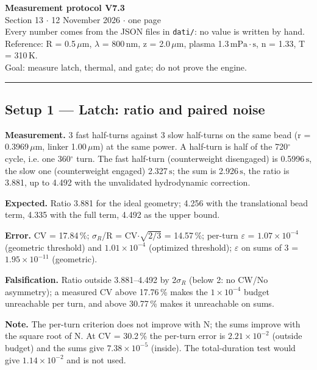 \documentclass[9pt,a4paper]{article}
\begin{document}
\raggedright
\fontsize{9.5}{11.4}\selectfont
\begin{center}
{\Large\bfseries Measurement protocol V7.3}\\[2pt]
{\small Section 13 $\cdot$ 12 November 2026 $\cdot$ one page}\\
{\small Every number comes from the JSON files in \texttt{dati/}: no value is written by hand.}\\
{\small Reference: R = 0.5\,$\mu\mathrm{m}$, $\lambda$ = 800\,$\mathrm{nm}$, z = 2.0\,$\mu\mathrm{m}$, plasma 1.3\,$\mathrm{mPa}\cdot\mathrm{s}$, n = 1.33, T = 310\,$\mathrm{K}$.}\\
{\small Goal: measure latch, thermal, and gate; do not prove the engine.}
\end{center}
\hrule\vspace{2pt}
\subsection*{Setup 1 --- Latch: ratio and paired noise}
\textbf{Measurement.} 3 fast half-turns against 3 slow half-turns on the same bead (r = 0.3969\,$\mu\mathrm{m}$, linker 1.00\,$\mu\mathrm{m}$) at the same power. A half-turn is half of the 720$^{\circ}$ cycle, i.e. one 360$^{\circ}$ turn. The fast half-turn (counterweight disengaged) is 0.5996\,$\mathrm{s}$, the slow one (counterweight engaged) 2.327\,$\mathrm{s}$; the sum is 2.926\,$\mathrm{s}$, the ratio is 3.881, up to 4.492 with the unvalidated hydrodynamic correction.

\textbf{Expected.} Ratio 3.881 for the ideal geometry; 4.256 with the translational bead term, 4.335 with the full term, 4.492 as the upper bound.

\textbf{Error.} CV = 17.84\,\%; $\sigma_R$/R = CV$\cdot$$\sqrt{2/3}$ = 14.57\,\%; per-turn $\varepsilon$ = $1.07\times 10^{-4}$ (geometric threshold) and $1.01\times 10^{-4}$ (optimized threshold); $\varepsilon$ on sums of 3 = $1.95\times 10^{-11}$ (geometric).

\textbf{Falsification.} Ratio outside 3.881--4.492 by 2$\sigma_R$ (below 2: no CW/No asymmetry); a measured CV above 17.76\,\% makes the $1\times 10^{-4}$ budget unreachable per turn, and above 30.77\,\% makes it unreachable on sums.

\textbf{Note.} The per-turn criterion does not improve with N; the sums improve with the square root of N. At CV = 30.2\,\% the per-turn error is $2.21\times 10^{-2}$ (outside budget) and the sums give $7.38\times 10^{-5}$ (inside). The total-duration test would give $1.14\times 10^{-2}$ and is not used.
\end{document}
